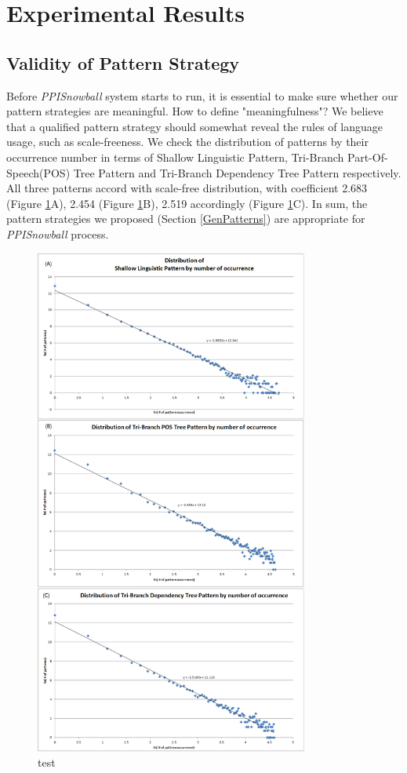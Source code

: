\section{Experimental Results}
\label{ExpResult}

\subsection{Validity of Pattern Strategy}
\label{validPattern}

Before \emph{PPISnowball} system starts to run, it is essential to make sure whether our pattern strategies are meaningful. How to define "meaningfulness"? We believe that a qualified pattern strategy should somewhat reveal the rules of language usage, such as scale-freeness\cite{DBLP:journals/advcs/Corominas-MurtraVS09}. We check the distribution of patterns by their occurrence number in terms of Shallow Linguistic Pattern, Tri-Branch Part-Of-Speech(POS) Tree Pattern and Tri-Branch Dependency Tree Pattern respectively. All three patterns accord with scale-free distribution, with coefficient 2.683 (Figure \ref{fig:valFig}A), 2.454 (Figure \ref{fig:valFig}B), 2.519 accordingly (Figure \ref{fig:valFig}C). In sum, the pattern strategies we proposed (Section \ref{GenPatterns}) are appropriate for \emph{PPISnowball} process.

\begin{flushleft}
\begin{figure}
\includegraphics[width=90mm]{fig/figure8.png}
\caption{test}
\label{fig:valFig}
\end{figure}
\end{flushleft}

